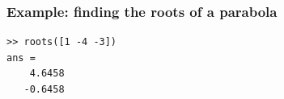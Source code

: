 \begin{frame}[fragile]
  \frametitle{Example: finding the roots of a parabola}
  \begin{lstlisting}
>> roots([1 -4 -3])
ans =
    4.6458
   -0.6458
  \end{lstlisting}
\end{frame}



%
%      
%
